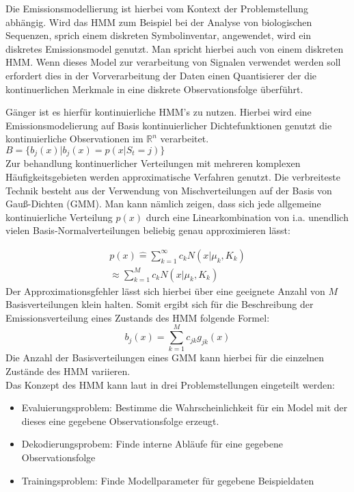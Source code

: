 Die Emissionsmodellierung ist hierbei vom Kontext der Problemstellung abhängig.
Wird das \acl{HMM} zum Beispiel bei der Analyse von biologischen Sequenzen,
sprich einem diskreten Symbolinventar, angewendet, wird ein diskretes
Emissionsmodel genutzt. Man spricht hierbei auch von einem diskreten \acl{HMM}.
Wenn dieses Model zur verarbeitung von Signalen verwendet werden soll erfordert
dies in der Vorverarbeitung der Daten einen Quantisierer der die
kontinuerlichen Merkmale in eine diskrete Observationsfolge überführt. 

Gänger ist es hierfür kontinuierliche \acl{HMM}'s zu nutzen. Hierbei wird eine
Emissionsmodelierung auf Basis kontinuierlicher Dichtefunktionen genutzt die
kontinuierliche Observationen im \(\mathbb{R}^n\) verarbeitet.\\ 
\( B =\{ b_{j}(x) | b_{j}(x) = p(x|S_t = j) \} \)\\
Zur behandlung kontinuerlicher Verteilungen mit mehreren komplexen
Häufigkeitsgebieten werden approximatische Verfahren genutzt. Die verbreiteste
Technik besteht aus der Verwendung von Mischverteilungen auf der Basis von
Gauß-Dichten (\acl{GMM}). Man kann nämlich zeigen, dass sich jede allgemeine
kontinuierliche Verteilung \(p(x)\) durch eine Linearkombination von i.a. unendlich vielen
Basis-Normalverteilungen beliebig genau approximieren lässt\cite[69]{mmmFink}:
 
\begin{multline}
p(x) \hat{=} \sum_{k=1}^\infty c_{k} N(x|\mu_{k},K_{k})\\
\approx \sum_{k=1}^M c_{k} N(x|\mu_{k},K_{k})  
\end{multline}
Der Approximationsgfehler lässt sich hierbei über eine geeignete Anzahl von
\(M\) Basisverteilungen klein halten. Somit ergibt sich für die Beschreibung der
Emissionsverteilung eines Zustands des \acl{HMM} folgende Formel:
\begin{equation}
b_{j}(x) = \sum_{k=1}^M c_{jk}g_{jk}(x)
\end{equation}
Die Anzahl der Basisverteilungen eines \acl{GMM} kann hierbei für die einzelnen
Zustände des HMM variieren.\\

Das Konzept des \acl{HMM} kann laut \cite{rabiner} in drei Problemstellungen eingeteilt werden:
\begin{itemize}
  \item Evaluierungsproblem: Bestimme die Wahrscheinlichkeit für ein Model mit
  der dieses eine gegebene Observationsfolge erzeugt.
  \item Dekodierungsprobem: Finde interne Abläufe für eine gegebene Observationsfolge
  \item Trainingsproblem: Finde Modellparameter für gegebene Beispieldaten
\end{itemize}

